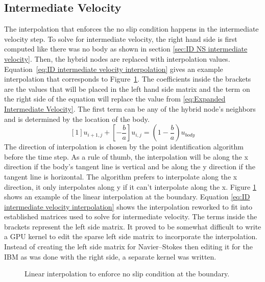 \subsection{Intermediate Velocity}
\label{sec:ID fadlun intermediate velocity}
The interpolation that enforces the no slip condition happens in the intermediate velocity step. 
To solve for intermediate velocity, the right hand side is first computed like there was no body as shown in section \ref{sec:ID NS intermediate velocity}. 
Then, the hybrid nodes are replaced with interpolation values. 
Equation~\eqref{eq:ID intermediate velocity interpolation} gives an example interpolation that corresponds to Figure~\ref{fig:ID linear interpolation}. 
The coefficients inside the brackets are the values that will be placed in the left hand side matrix and the term on the right side of the equation will replace the value from \ref{eq:Expanded Intermediate Velocity}. 
The first term can be any of the hybrid node's neighbors and is determined by the location of the body. 
\begin{equation}
\left[1\right]u_{i+1,j} + \left[-\frac{b}{a}\right]u_{i,j} = \left(1-\frac{b}{a}\right)u_{body}
\label{eq:ID intermediate velocity interpolation}
\end{equation}
The direction of interpolation is chosen by the point identification algorithm before the time step. 
As a rule of thumb, the interpolation will be along the x direction if the body's tangent line is vertical and be along the y direction if the tangent line is horizontal. 
The algorithm prefers to interpolate along the x direction, it only interpolates along y if it can't interpolate along the x. 
Figure \ref{fig:ID linear interpolation} shows an example of the linear interpolation at the boundary. 
Equation \eqref{eq:ID intermediate velocity interpolation} shows the interpolation reworked to fit into established matrices used to solve for intermediate velocity. 
The terms inside the brackets represent the left side matrix. 
It proved to be somewhat difficult to write a GPU kernel to edit the sparse left side matrix to incorporate the interpolation. 
Instead of creating the left side matrix for Navier--Stokes then editing it for the IBM as was done with the right side, a separate kernel was written. 

\begin{figure}[!htb]
	\centering
	
	\caption{Linear interpolation to enforce no slip condition at the boundary.}
	\label{fig:ID linear interpolation}
\end{figure}

